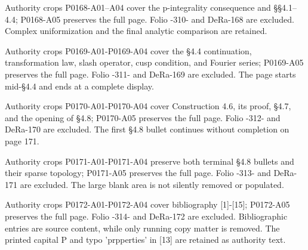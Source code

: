 \documentclass[11pt,a4paper]{article}
\begin{document}
\par\medskip
\hypertarget{D018-P0168}{}
\par\smallskip
Authority crops P0168-A01–A04 cover the p-integrality consequence and §§4.1–4.4; P0168-A05 preserves the full page. Folio -310- and DeRa-168 are excluded. Complex uniformization and the final analytic comparison are retained.


\par\medskip
\hypertarget{D018-P0169}{}
\par\smallskip
Authority crops P0169-A01-P0169-A04 cover the §4.4 continuation, transformation law, slash operator, cusp condition, and Fourier series; P0169-A05 preserves the full page. Folio -311- and DeRa-169 are excluded. The page starts mid-§4.4 and ends at a complete display.


\par\medskip
\hypertarget{D018-P0170}{}
\par\smallskip
Authority crops P0170-A01-P0170-A04 cover Construction 4.6, its proof, §4.7, and the opening of §4.8; P0170-A05 preserves the full page. Folio -312- and DeRa-170 are excluded. The first §4.8 bullet continues without completion on page 171.


\par\medskip
\hypertarget{D018-P0171}{}
\par\smallskip
Authority crops P0171-A01-P0171-A04 preserve both terminal §4.8 bullets and their sparse topology; P0171-A05 preserves the full page. Folio -313- and DeRa-171 are excluded. The large blank area is not silently removed or populated.


\par\medskip
\hypertarget{D018-P0172}{}
\par\smallskip
Authority crops P0172-A01-P0172-A04 cover bibliography [1]-[15]; P0172-A05 preserves the full page. Folio -314- and DeRa-172 are excluded. Bibliographic entries are source content, while only running copy matter is removed. The printed capital P and typo 'prpperties' in [13] are retained as authority text.
\end{document}

